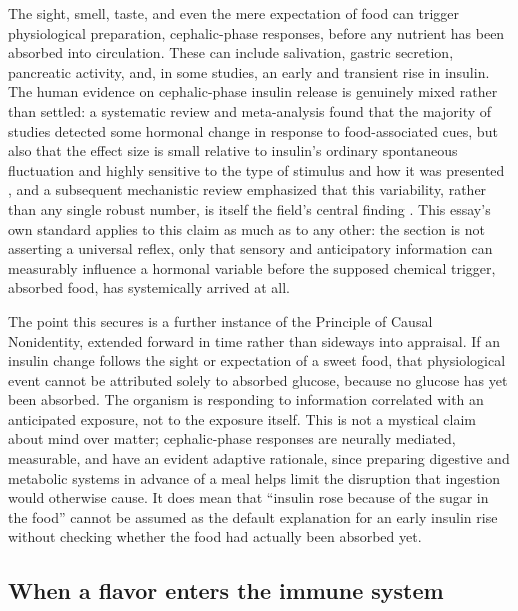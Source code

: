 \documentclass[11pt]{article}
\begin{document}
The sight, smell, taste, and even the mere expectation of food can trigger physiological preparation, cephalic-phase responses, before any nutrient has been absorbed into circulation. These can include salivation, gastric secretion, pancreatic activity, and, in some studies, an early and transient rise in insulin. The human evidence on cephalic-phase insulin release is genuinely mixed rather than settled: a systematic review and meta-analysis found that the majority of studies detected some hormonal change in response to food-associated cues, but also that the effect size is small relative to insulin's ordinary spontaneous fluctuation and highly sensitive to the type of stimulus and how it was presented \citep{wiedemann2020cephalic}, and a subsequent mechanistic review emphasized that this variability, rather than any single robust number, is itself the field's central finding \citep{pullicin2021cephalic}. This essay's own standard applies to this claim as much as to any other: the section is not asserting a universal reflex, only that sensory and anticipatory information can measurably influence a hormonal variable before the supposed chemical trigger, absorbed food, has systemically arrived at all.

The point this secures is a further instance of the Principle of Causal Nonidentity, extended forward in time rather than sideways into appraisal. If an insulin change follows the sight or expectation of a sweet food, that physiological event cannot be attributed solely to absorbed glucose, because no glucose has yet been absorbed. The organism is responding to information correlated with an anticipated exposure, not to the exposure itself. This is not a mystical claim about mind over matter; cephalic-phase responses are neurally mediated, measurable, and have an evident adaptive rationale, since preparing digestive and metabolic systems in advance of a meal helps limit the disruption that ingestion would otherwise cause. It does mean that ``insulin rose because of the sugar in the food'' cannot be assumed as the default explanation for an early insulin rise without checking whether the food had actually been absorbed yet.

\subsection{When a flavor enters the immune system}
\end{document}
